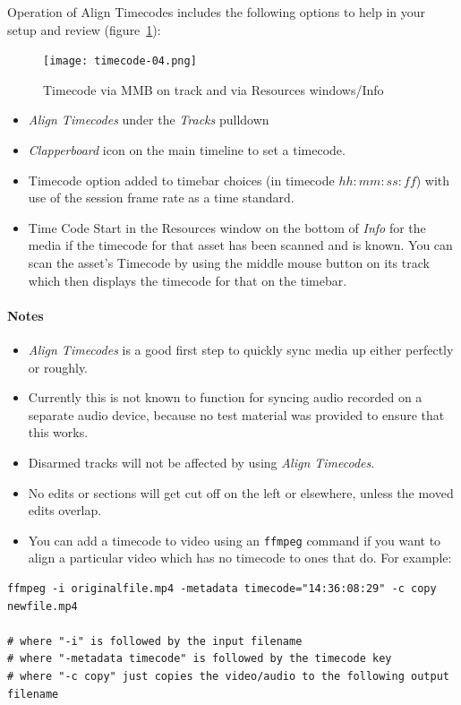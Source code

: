Operation of Align Timecodes includes the following options to help in your setup and review (figure~\ref{fig:timecode-04}):

\begin{figure}[ht]
	\centering
	\texttt{[image: timecode-04.png]}
	\caption{Timecode via MMB on track and via Resources windows/Info}
	\label{fig:timecode-04}
\end{figure}

\begin{itemize}
	\item \textit{Align Timecodes} under the \textit{Tracks} pulldown
	\item \textit{Clapperboard} icon on the main timeline to set a timecode.
	\item Timecode option added to timebar choices (in timecode $hh:mm:ss:ff$) with use of the session frame
	rate as a time standard.
	\item Time Code Start in the Resources window on the bottom of \textit{Info} for the media if the timecode for that
	asset has been scanned and is known. You can scan the asset’s Timecode by using the middle mouse
	button on its track which then displays the timecode for that on the timebar.
\end{itemize}

\paragraph*{Notes}

\begin{itemize}
	\item \textit{Align Timecodes} is a good first step to quickly sync media up either perfectly or roughly.
	\item Currently this is not known to function for syncing audio recorded on a separate audio device,
	because no test material was provided to ensure that this works.
	\item Disarmed tracks will not be affected by using \textit{Align Timecodes}.
	\item No edits or sections will get cut off on the left or elsewhere, unless the moved edits overlap.
	\item You can add a timecode to video using an \texttt{ffmpeg} command if you want to align a particular video
	which has no timecode to ones that do. For example:
\end{itemize}

\begin{lstlisting}[style=sh]
ffmpeg -i originalfile.mp4 -metadata timecode="14:36:08:29" -c copy newfile.mp4

# where "-i" is followed by the input filename
# where "-metadata timecode" is followed by the timecode key
# where "-c copy" just copies the video/audio to the following output filename
\end{lstlisting}


